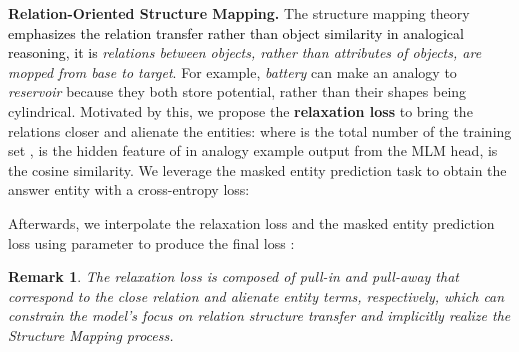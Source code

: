 \documentclass{article} \usepackage{iclr2023_conference,times}
\newtheorem{remark}{\noindent \textbf{Remark}}
\begin{document}
\textbf{Relation-Oriented Structure Mapping.}
The structure mapping theory \textcolor{black}{emphasizes the relation transfer rather than object similarity in analogical reasoning, it is} \textit{relations between objects, rather than attributes of objects, are mopped from base to target}.  For example, \textit{battery} can make an analogy to \textit{reservoir} because they both store potential, rather than their shapes being cylindrical. 
Motivated by this, we propose the \textbf{relaxation loss} to bring the relations closer and alienate the entities:
where  is the total number of the training set ,  is the hidden feature of  in analogy example  output from the MLM head,  is the cosine similarity.
We leverage the masked entity prediction task to obtain the answer entity  with a cross-entropy loss: 

Afterwards, we interpolate the relaxation loss  and the masked entity prediction loss  using parameter  to produce the final loss :

\begin{remark}
The relaxation loss is composed of pull-in and pull-away that correspond to the close relation and alienate entity terms, respectively, which can constrain the model's focus on relation structure transfer and implicitly realize the Structure Mapping process. 
\end{remark}
\end{document}
